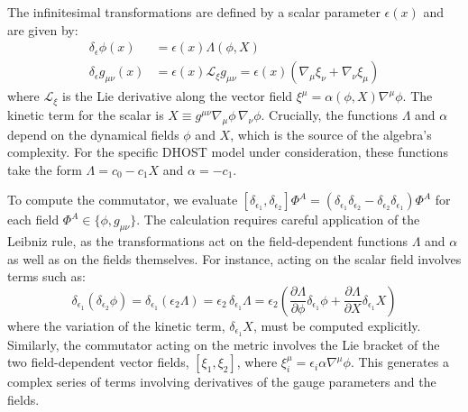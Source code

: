 \documentclass[twocolumn]{aastex631}
\begin{document}
The infinitesimal transformations are defined by a scalar parameter $\epsilon(x)$ and are given by:
\begin{align}
\delta_\epsilon \phi(x) &= \epsilon(x) \Lambda(\phi, X) \label{eq:transf_phi} \\
\delta_\epsilon g_{\mu\nu}(x) &= \epsilon(x) \mathcal{L}_{\xi} g_{\mu\nu} = \epsilon(x) (\nabla_\mu \xi_\nu + \nabla_\nu \xi_\mu) \label{eq:transf_g}
\end{align}
where $\mathcal{L}_{\xi}$ is the Lie derivative along the vector field $\xi^\mu = \alpha(\phi, X) \nabla^\mu \phi$. The kinetic term for the scalar is $X \equiv g^{\mu\nu}\nabla_\mu\phi\,\nabla_\nu\phi$. Crucially, the functions $\Lambda$ and $\alpha$ depend on the dynamical fields $\phi$ and $X$, which is the source of the algebra's complexity. For the specific DHOST model under consideration, these functions take the form $\Lambda = c_0 - c_1 X$ and $\alpha = -c_1$.

To compute the commutator, we evaluate $[\delta_{\epsilon_1}, \delta_{\epsilon_2}] \Phi^A = (\delta_{\epsilon_1}\delta_{\epsilon_2} - \delta_{\epsilon_2}\delta_{\epsilon_1})\Phi^A$ for each field $\Phi^A \in \{\phi, g_{\mu\nu}\}$. The calculation requires careful application of the Leibniz rule, as the transformations act on the field-dependent functions $\Lambda$ and $\alpha$ as well as on the fields themselves. For instance, acting on the scalar field involves terms such as:
\begin{equation}
\delta_{\epsilon_1}(\delta_{\epsilon_2}\phi) = \delta_{\epsilon_1}(\epsilon_2 \Lambda) = \epsilon_2 \, \delta_{\epsilon_1}\Lambda = \epsilon_2 \left( \frac{\partial\Lambda}{\partial\phi}\delta_{\epsilon_1}\phi + \frac{\partial\Lambda}{\partial X}\delta_{\epsilon_1}X \right)
\end{equation}
where the variation of the kinetic term, $\delta_{\epsilon_1}X$, must be computed explicitly. Similarly, the commutator acting on the metric involves the Lie bracket of the two field-dependent vector fields, $[\xi_1, \xi_2]$, where $\xi_i^\mu = \epsilon_i \alpha \nabla^\mu \phi$. This generates a complex series of terms involving derivatives of the gauge parameters and the fields.
\end{document}
